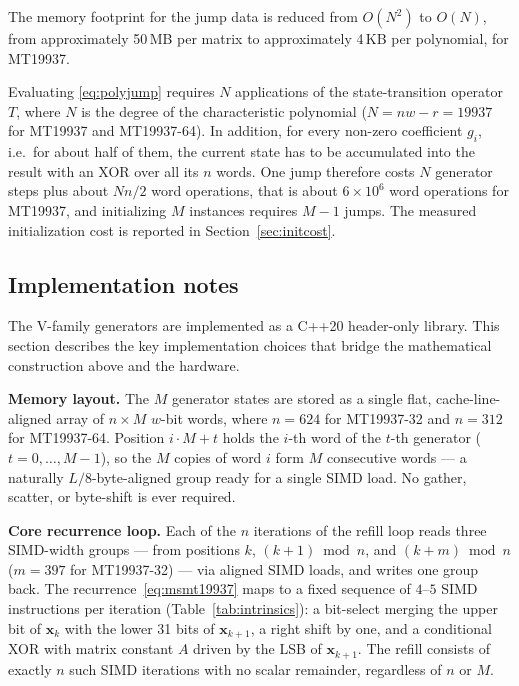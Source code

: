 \documentclass[preprint,1p,times]{elsarticle}
\begin{document}
The memory footprint for the jump data is reduced from $O(N^2)$ to $O(N)$, from approximately 50\,MB per matrix to approximately 4\,KB per polynomial, for MT19937.

Evaluating \eqref{eq:polyjump} requires $N$ applications of the state-transition operator $T$, where $N$ is the degree of the characteristic polynomial ($N = nw - r = 19937$ for MT19937 and MT19937-64). In addition, for every non-zero coefficient $g_i$, i.e.\ for about half of them, the current state has to be accumulated into the result with an XOR over all its $n$ words. One jump therefore costs $N$ generator steps plus about $N n / 2$ word operations, that is about $6 \times 10^6$ word operations for MT19937, and initializing $M$ instances requires $M-1$ jumps. The measured initialization cost is reported in Section~\ref{sec:initcost}.


\subsection{Implementation notes}
\label{sec:implementation}

The V-family generators are implemented as a C++20 header-only library. This section describes the key implementation choices that bridge the mathematical construction above and the hardware.

\textbf{Memory layout.}
The $M$ generator states are stored as a single flat, cache-line-aligned array of $n \times M$ $w$-bit words, where $n=624$ for MT19937-32 and $n=312$ for MT19937-64. Position $i \cdot M + t$ holds the $i$-th word of the $t$-th generator ($t=0,\ldots,M-1$), so the $M$ copies of word $i$ form $M$ consecutive words --- a naturally $L/8$-byte-aligned group ready for a single SIMD load. No gather, scatter, or byte-shift is ever required.

\textbf{Core recurrence loop.}
Each of the $n$ iterations of the refill loop reads three SIMD-width groups --- from positions $k$, $(k+1)\bmod n$, and $(k+m)\bmod n$ ($m=397$ for MT19937-32) --- via aligned SIMD loads, and writes one group back. The recurrence~\eqref{eq:msmt19937} maps to a fixed sequence of $4$--$5$ SIMD instructions per iteration (Table~\ref{tab:intrinsics}): a bit-select merging the upper bit of $\mathbf{x}_k$ with the lower 31 bits of $\mathbf{x}_{k+1}$, a right shift by one, and a conditional XOR with matrix constant $A$ driven by the LSB of $\mathbf{x}_{k+1}$. The refill consists of exactly $n$ such SIMD iterations with no scalar remainder, regardless of $n$ or $M$.
\end{document}
